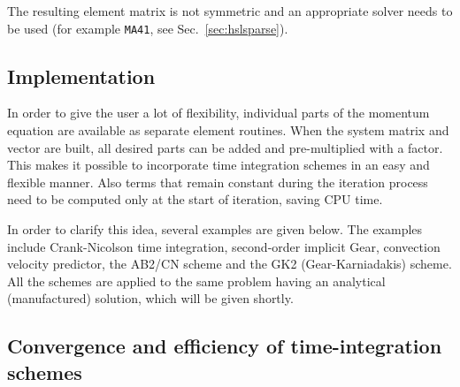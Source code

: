 The resulting element matrix is not symmetric and an appropriate solver needs to be used (for example
\texttt{MA41}, see Sec.~\ref{sec:hslsparse}).

\subsection{Implementation}

In order to give the user a lot of flexibility, individual parts of the momentum equation are available as separate element routines.
When the system matrix and vector are built, all desired parts can be added and pre-multiplied with a factor.
This makes it possible to incorporate time integration schemes in an easy and flexible manner. Also terms that remain constant 
during the iteration process need to be computed only at the start of iteration, saving CPU time.
                  
In order to clarify this idea, several examples are given below.
The examples include Crank-Nicolson time
integration, second-order implicit Gear,
convection velocity predictor, the AB2/CN scheme and the  GK2 (Gear-Karniadakis) scheme. All the schemes are
applied to the same problem having an analytical (manufactured) solution, which will be given shortly.
         
\subsection{Convergence and efficiency of time-integration schemes}


